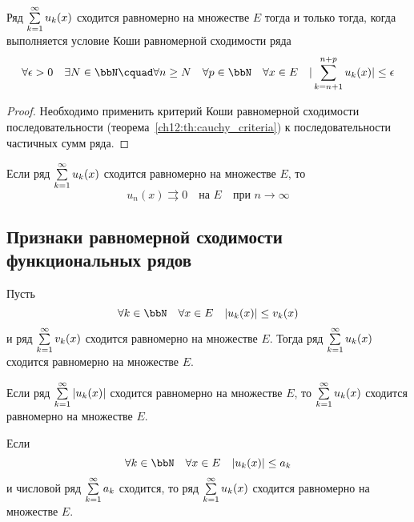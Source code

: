 \begin{thm}
	\label{ch12:th:cauchy_criteria_series}
	Ряд $\sum_{k=1}^{\infty}\limits u_k(x)$ сходится равномерно на множестве $E$ тогда
	и только тогда, когда выполняется условие Коши равномерной сходимости ряда
	\begin{equation}
		\label{ch12:p1:eq:cauchy_cond_series}
		\forall \epsilon > 0 \quad \exists N \in \bbN \cquad
			\forall n \ge N \quad \forall p \in \bbN \quad \forall x \in E \quad
			|\sum_{k=n+1}^{n+p} u_k(x)| \le \epsilon
	\end{equation}
\end{thm}
\begin{proof}
	Необходимо применить критерий Коши равномерной сходимости последовательности
	(теорема~\ref{ch12:th:cauchy_criteria}) к последовательности частичных сумм ряда.
\end{proof}
\begin{cons}
	Если ряд $\sum_{k=1}^{\infty}\limits u_k(x)$ сходится равномерно на множестве $E$,
	то
	$$
		u_n(x) \rightrightarrows 0 \quad \text{на } E \quad \text{при } n \to \infty
	$$
\end{cons}


\subsection{Признаки равномерной сходимости функциональных рядов}

\begin{thm}
	Пусть
	$$
		\forall k \in \bbN \quad \forall x \in E \quad |u_k(x)| \le v_k(x)
	$$
	и ряд $\sum_{k=1}^{\infty}\limits v_k(x)$ сходится равномерно на множестве $E$.
	Тогда ряд $\sum_{k=1}^{\infty}\limits u_k(x)$ сходится равномерно на множестве $E$.
\end{thm}
\begin{cons}
	Если ряд $\sum_{k=1}^{\infty}\limits |u_k(x)|$ сходится равномерно на множестве $E$,
	то $\sum_{k=1}^{\infty}\limits u_k(x)$ сходится равномерно на множестве $E$.
\end{cons}

\begin{thm}
	Если
	$$
		\forall k \in \bbN \quad \forall x \in E \quad |u_k(x)| \le a_k
	$$
	и числовой ряд $\sum_{k=1}^{\infty}\limits a_k$ сходится, то
	ряд $\sum_{k=1}^{\infty}\limits u_k(x)$ сходится равномерно на множестве $E$.
\end{thm}


